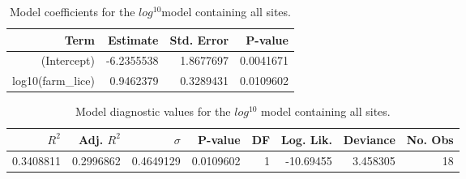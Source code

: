 \begin{table}
\centering
\caption{Model coefficients for the $log^10$model containing all sites.}
\centering
\begin{tabular}[t]{rrrr}
\toprule
Term & Estimate & Std. Error & P-value\\
\midrule
(Intercept) & -6.2355538 & 1.8677697 & 0.0041671\\
log10(farm\_lice) & 0.9462379 & 0.3289431 & 0.0109602\\
\bottomrule
\end{tabular}
\end{table}

\begin{table}
\centering
\caption{Model diagnostic values for the $log^10$ model containing
    all sites.}
\centering
\begin{tabular}[t]{rrrrrrrr}
\toprule
$R^2$ & Adj. $R^2$ & $\sigma$ & P-value & DF & Log. Lik. & Deviance & No. Obs\\
\midrule
0.3408811 & 0.2996862 & 0.4649129 & 0.0109602 & 1 & -10.69455 & 3.458305 & 18\\
\bottomrule
\end{tabular}
\end{table}
